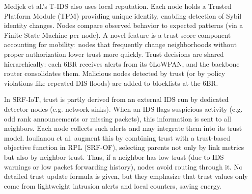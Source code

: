 \documentclass[final,5p,times,twocolumn]{elsarticle}
\begin{document}
\vspace{0.5em}

Medjek et al.’s T-IDS also uses local reputation. Each node holds a Trusted Platform Module (TPM) providing unique identity, enabling detection of Sybil identity changes. Nodes compare observed behavior to expected patterns (via a Finite State Machine per node). A novel feature is a trust score component accounting for mobility: nodes that frequently change neighborhoods without proper authorization lower trust more quickly. Trust decisions are shared hierarchically: each 6BR receives alerts from its 6LoWPAN, and the backbone router consolidates them. Malicious nodes detected by trust (or by policy violations like repeated DIS floods) are added to blocklists at the 6BR.

\vspace{0.5em}

In SRF-IoT, trust is partly derived from an external IDS run by dedicated detector nodes (e.g. network sinks). When an IDS flags suspicious activity (e.g. odd rank announcements or missing packets), this information is sent to all neighbors. Each node collects such alerts and may integrate them into its trust model. Ioulianou et al. augment this by combining trust with a trust-based objective function in RPL (SRF-OF), selecting parents not only by link metrics but also by neighbor trust. Thus, if a neighbor has low trust (due to IDS warnings or low packet forwarding history), nodes avoid routing through it. No detailed trust update formula is given, but they emphasize that trust values only come from lightweight intrusion alerts and local counters, saving energy.
\end{document}
